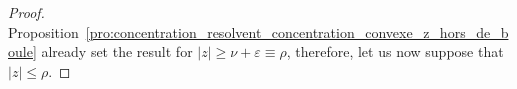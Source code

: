 \documentclass[a4papaer, titlepage]{book}
\begin{document}
\begin{proof}
  Proposition~\ref{pro:concentration_resolvent_concentration_convexe_z_hors_de_boule} already set the result for $|z| \geq \nu + \varepsilon\equiv \rho $, therefore, let us now suppose that $|z| \leq \rho$. 



\end{proof}
\end{document}
